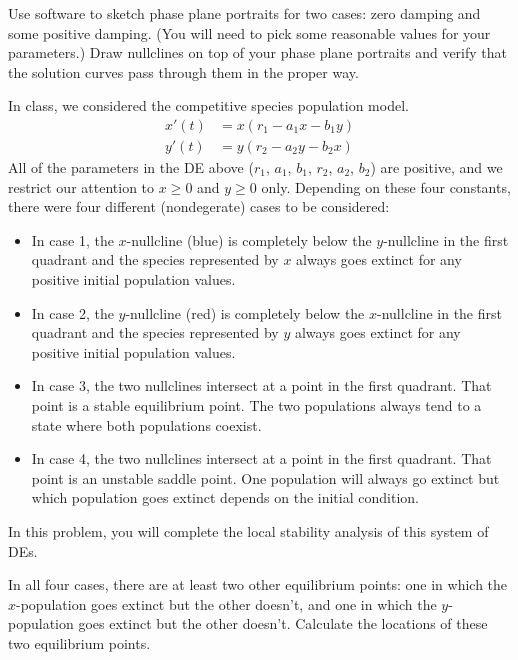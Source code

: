 \documentclass[boxes]{gsypset}
\begin{document}
\begin{problem}
\begin{subproblems}
\begin{solution}
				\end{solution}
			\subproblem 
				Use software to sketch phase plane portraits for two cases: 
				zero damping and some positive damping. 
				(You will need to pick some reasonable values for your parameters.) 
				Draw nullclines on top of your phase plane portraits and 
				verify that the solution curves pass through them in the proper way.
				\begin{solution}
					
				\end{solution}
		\end{subproblems}
	\end{problem}
	
	\begin{problem}
		In class, we considered the competitive species population model.
		\begin{align*}
			x'(t) &= x(r_1-a_1x-b_1y) \\
			y'(t) &= y(r_2-a_2y-b_2x)
		\end{align*} 
		All of the parameters in the DE above ($r_1$, $a_1$, $b_1$, $r_2$, $a_2$, $b_2$) are positive, 
		and we restrict our attention to $x\geq 0$ and $y\geq 0$ only. 
		Depending on these four constants, 
		there were four different (nondegerate) cases to be considered:
		\begin{itemize}
			\item 
				In case 1, the $x$-nullcline (blue) is completely below the
			  $y$-nullcline in the first quadrant and the species represented by
			  $x$ always goes extinct for any positive initial population values.
			\item 
				In case 2, the $y$-nullcline (red) is completely below the $x$-nullcline 
				in the first quadrant and the species represented by $y$ 
				always goes extinct for any positive initial population values.
			\item 
				In case 3, the two nullclines intersect at a point in the first quadrant. 
				That point is a stable equilibrium point. 
				The two populations always tend to a state where both populations coexist.
			\item 
				In case 4, the two nullclines intersect at a point in the first quadrant. 
				That point is an unstable saddle point. 
				One population will always go extinct but 
				which population goes extinct depends on the initial condition.
		\end{itemize}
		\hmcbreakproblem
		In this problem, you will complete the local stability analysis of this system of DEs.
		\begin{subproblems}
			\subproblem 
				In all four cases, there are at least two other equilibrium points: 
				one in which the $x$-population goes extinct but the other doesn't, and 
				one in which the $y$-population goes extinct but the other doesn't.  
				Calculate the locations of these two equilibrium points.
				\begin{solution}
					

\end{solution}
\end{subproblems}
\end{problem}
\end{document}
